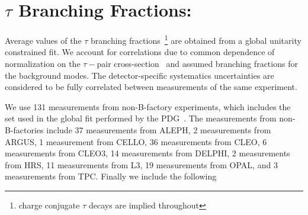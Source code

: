 \documentclass[fleqn,twoside]{article}
\begin{document}
\section{$\tau$ Branching Fractions:}
\label{sec:Tau_BR}

Average values of the $\tau$ branching fractions~\footnote{charge conjugate $\tau$ decays are implied throughout}
are obtained from a global unitarity constrained fit.
We account for correlations due to common dependence of
normalization on the $\tau-$pair cross-section~\cite{Banerjee:2007is}
and assumed branching fractions for the background modes. 
The detector-specific systematics uncertainties are considered to be fully correlated between
measurements of the same experiment.

We use 131 measurements from non-B-factory experiments, 
which includes the set used in the global fit performed by the PDG~\cite{PDG_2010}. 
The measurements from non-B-factories include
     37 measurements from ALEPH,
      2 measurements from ARGUS,
      1 measurement from CELLO,
     36 measurements from CLEO,
      6 measurements from CLEO3,
     14 measurements from DELPHI,
      2 measurements from HRS,
     11 measurements from L3,
     19 measurements from OPAL, and
      3 measurements from TPC.
Finally we include the following
\end{document}
